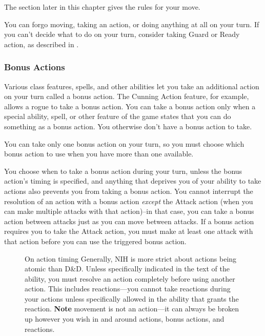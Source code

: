 The  section later in this chapter gives the rules for your move.

You can forgo moving, taking an action, or doing anything at all on your turn. If you can't decide what to do on your turn, consider taking Guard or Ready action, as described in .

\subsubsection{Bonus Actions}

Various class features, spells, and other abilities let you take an additional action on your turn called a bonus action. The Cunning Action feature, for example, allows a rogue to take a bonus action. You can take a bonus action only when a special ability, spell, or other feature of the game states that you can do something as a bonus action. You otherwise don't have a bonus action to take.

You can take only one bonus action on your turn, so you must choose which bonus action to use when you have more than one available.

You choose when to take a bonus action during your turn, unless the bonus action's timing is specified, and anything that deprives you of your ability to take actions also prevents you from taking a bonus action. You cannot interrupt the resolution of an action with a bonus action \textit{except} the Attack action (when you can make multiple attacks with that action)--in that case, you can take a bonus action between attacks just as you can move between attacks. If a bonus action requires you to take the Attack action, you must make at least one attack with that action before you can use the triggered bonus action.

\begin{figure}
    \begin{DndComment}{On action timing}
        Generally, NIH is more strict about actions being atomic than D\&D. Unless specifically indicated in the text of the ability, you must resolve an action completely before using another action. This includes reactions---you cannot take reactions during your actions unless specifically allowed in the ability that grants the reaction. \textbf{Note} movement is not an action---it can always be broken up however you wish in and around actions, bonus actions, and reactions.
    \end{DndComment}
\end{figure}


